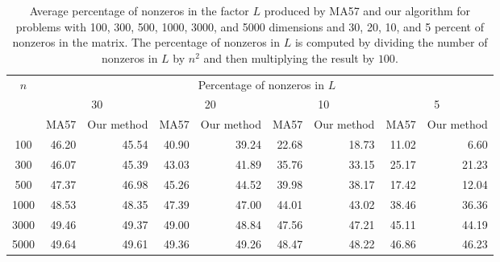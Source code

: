 \documentclass{article}
\begin{document}
\begin{table}
\caption{Average percentage of nonzeros in the factor $L$ produced by MA57 and our algorithm for problems with 100, 300, 500, 1000, 3000, and 5000 dimensions and 30, 20, 10, and 5 percent of nonzeros in the matrix.  The percentage of nonzeros in $L$ is computed by dividing the number of nonzeros in $L$ by $n^2$ and then multiplying the result by $100$.}\label{table1}
\begin{tabular}{|c|r|r|r|r|r|r|r|r|}
\hline
\multirow{3}{*}{$n$} 
&\multicolumn{8}{c|}{Percentage of nonzeros in $L$}\\
\cline{2-9}
&\multicolumn{2}{c|}{30}
&\multicolumn{2}{c|}{20}
&\multicolumn{2}{c|}{10}
&\multicolumn{2}{c|}{5}\\
\cline{2-9}
&MA57
&Our method
&MA57
&Our method
&MA57
&Our method
&MA57
&Our method\\
\hline
100&46.20&45.54&40.90&39.24&22.68&18.73&11.02&6.60\\
300&46.07&45.39&43.03&41.89&35.76&33.15&25.17&21.23\\
500&47.37&46.98&45.26&44.52&39.98&38.17&17.42&12.04\\
1000&48.53&48.35&47.39&47.00&44.01&43.02&38.46&36.36\\
3000&49.46&49.37&49.00&48.84&47.56&47.21&45.11&44.19\\
5000&49.64&49.61&49.36&49.26&48.47&48.22&46.86&46.23\\
\hline
\end{tabular}
\end{table}
\end{document}

